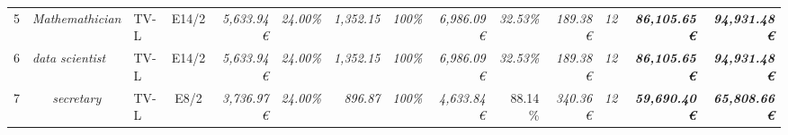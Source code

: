 \begin{table}[]
\begin{tabular}{clllcrrrrrrrrrr}
5                                                                                       & \multicolumn{2}{l}{\cellcolor[HTML]{FFFF99}\textit{Mathemathician}}                   & \cellcolor[HTML]{FFFF99}TV-L      & \cellcolor[HTML]{FFFF99}E14/2                & \cellcolor[HTML]{FFFF99}\textit{5,633.94 €}         & \textit{24.00\%}                                      & \textit{1,352.15}                            & \cellcolor[HTML]{FFFF99}\textit{100\%}                  & \cellcolor[HTML]{92D050}\textit{6,986.09 €}  & \cellcolor[HTML]{FFFF99}\textit{32.53\%}       & \cellcolor[HTML]{92D050}\textit{189.38 €}    & \cellcolor[HTML]{FFFF99}\textit{12}          & \cellcolor[HTML]{BFBFBF}\textit{\textbf{86,105.65 €}}           & \textit{\textbf{94,931.48 €}}                                                                 \\
6                                                                                       & \multicolumn{2}{l}{\cellcolor[HTML]{FFFF99}\textit{data scientist}}                   & \cellcolor[HTML]{FFFF99}TV-L      & \cellcolor[HTML]{FFFF99}E14/2                & \cellcolor[HTML]{FFFF99}\textit{5,633.94 €}         & \textit{24.00\%}                                      & \textit{1,352.15}                            & \cellcolor[HTML]{FFFF99}\textit{100\%}                  & \cellcolor[HTML]{92D050}\textit{6,986.09 €}  & \cellcolor[HTML]{FFFF99}\textit{32.53\%}       & \cellcolor[HTML]{92D050}\textit{189.38 €}    & \cellcolor[HTML]{FFFF99}\textit{12}          & \cellcolor[HTML]{BFBFBF}\textit{\textbf{86,105.65 €}}           & \textit{\textbf{94,931.48 €}}                                                                 \\
7                                                                                       & \multicolumn{2}{c}{\cellcolor[HTML]{FFFF99}\textit{secretary}}                        & \cellcolor[HTML]{FFFF99}TV-L      & \cellcolor[HTML]{FFFF99}E8/2                 & \cellcolor[HTML]{FFFF99}\textit{3,736.97 €}         & \textit{24.00\%}                                      & \textit{896.87}                              & \cellcolor[HTML]{FFFF99}\textit{100\%}                  & \cellcolor[HTML]{92D050}\textit{4,633.84 €}  & 88.14 \%                                       & \cellcolor[HTML]{92D050}\textit{340.36 €}    & \cellcolor[HTML]{FFFF99}\textit{12}          & \cellcolor[HTML]{BFBFBF}\textit{\textbf{59,690.40 €}}           & \textit{\textbf{65,808.66 €}}                                                                 \\

\end{tabular}
\end{table}
